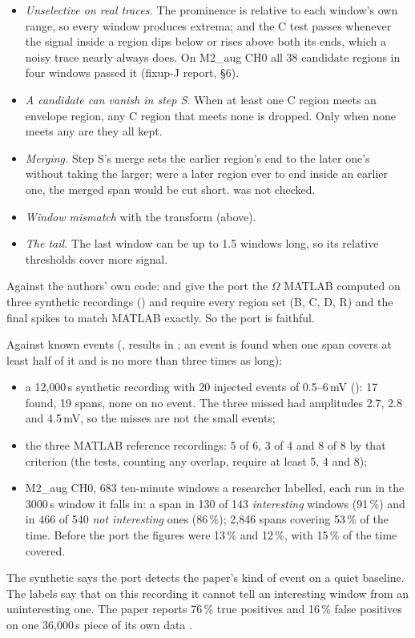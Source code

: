 \begin{itemize}
\item \emph{Unselective on real traces.} The prominence is relative to each window's own
  range, so every window produces extrema; and the C test passes whenever the signal inside a
  region dips below or rises above both its ends, which a noisy trace nearly always does. On
  M2\_aug CH0 all 38 candidate regions in four windows passed it (fixup-J report, \S6).
\item \emph{A candidate can vanish in step S.} When at least one C region meets an envelope
  region, any C region that meets none is dropped. Only when none meets any are they all kept.
\item \emph{Merging.} Step S's merge sets the earlier region's end to the later one's without
  taking the larger; were a later region ever to end inside an earlier one, the merged span
  would be cut short.  was not checked.
\item \emph{Window mismatch} with the transform (above).
\item \emph{The tail.} The last window can be up to 1.5 windows long, so its relative thresholds
  cover more signal.
\end{itemize}

Against the authors' own code:  and
 give the port the $\Omega$ MATLAB computed on
three synthetic recordings () and require every
region set (B, C, D, R) and the final spikes to match MATLAB exactly. So the port is faithful.

Against known events (, results in
; an event is found when one span covers at
least half of it and is no more than three times as long):
\begin{itemize}
\item a 12{,}000\,s synthetic recording with 20 injected events of 0.5--6\,mV
  (): 17 found, 19 spans, none on no event. The three missed
  had amplitudes 2.7, 2.8 and 4.5\,mV, so the misses are not the small events;
\item the three MATLAB reference recordings: 5 of 6, 3 of 4 and 8 of 8 by that criterion
  (the tests, counting any overlap, require at least 5, 4 and 8);
\item M2\_aug CH0, 683 ten-minute windows a researcher labelled, each run in the 3000\,s window
  it falls in: a span in 130 of 143 \emph{interesting} windows (91\,\%) and in 466 of 540
  \emph{not interesting} ones (86\,\%); 2{,}846 spans covering 53\,\% of the time. Before the
  port the figures were 13\,\% and 12\,\%, with 15\,\% of the time covered.
\end{itemize}
The synthetic says the port detects the paper's kind of event on a quiet baseline. The labels
say that on this recording it cannot tell an interesting window from an uninteresting one. The
paper reports 76\,\% true positives and 16\,\% false positives on one 36{,}000\,s piece of its
own data \citep{dehshibi2021electrical}.

